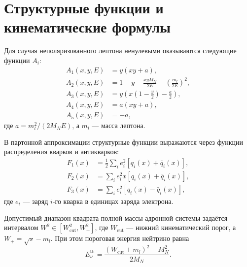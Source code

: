\section{Структурные функции и кинематические формулы}
\label{app:structure_functions}

Для случая неполяризованного лептона ненулевыми оказываются следующие функции $A_i$:
\begin{equation}
    \begin{aligned}
        A_1(x, y, E) &= y(xy + a), \\
        A_2(x, y, E) &= 1 - y - \frac{xyM_N}{2E} - \left( \frac{m_{l}}{2E} \right)^2, \\
        A_3(x, y, E) &= y\left( x\left(1 - \frac{y}{2} \right) - \frac{a}{2} \right), \\
        A_4(x, y, E) &= a(xy + a), \\
        A_5(x, y, E) &= -a,
    \end{aligned}
\end{equation}
где $a = m_l^2/(2M_N E)$, а $m_l$ — масса лептона.

В партонной аппроксимации структурные функции выражаются через функции распределения кварков и антикварков:
\begin{equation}
    \begin{aligned}
        F_1(x) &= \frac{1}{2} \sum\limits_{i} e_i^2 \left[ q_i(x) + \bar{q}_i(x) \right], \\
        F_2(x) &= \sum\limits_{i} e_i^2 x \left[ q_i(x) + \bar{q}_i(x) \right], \\
        F_3(x) &= \sum\limits_{i} e_i^2 \left[ q_i(x) - \bar{q}_i(x) \right],
    \end{aligned}
\end{equation}
где $e_i$ — заряд $i$-го кварка в единицах заряда электрона.

Допустимый диапазон квадрата полной массы адронной системы задаётся интервалом $W^2 \in [W^2_{\text{cut}}, W_+^2]$, где $W_{\text{cut}}$ — нижний кинематический порог, а $W_+ = \sqrt{s} - m_l$. При этом пороговая энергия нейтрино равна
\begin{equation}
    E_\nu^{\text{th}} = \frac{(W_{\text{cut}} + m_l)^2 - M_N^2}{2M_N}.
\end{equation}

